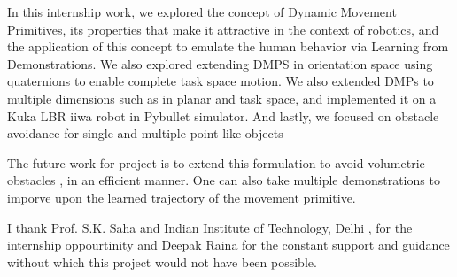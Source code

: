 In this internship work, we explored the concept of Dynamic Movement Primitives, its properties that make it
attractive in the context of robotics, and the application of this concept to emulate the human behavior via Learning
from Demonstrations. 
We also explored extending DMPS in orientation space using quaternions to enable complete task space motion. 
We also extended DMPs to multiple dimensions such as in planar and task space,
and implemented it on a Kuka LBR iiwa robot in Pybullet simulator.
And lastly, we focused on obstacle avoidance for single and multiple point like objects

The future work for project is to extend this formulation to avoid volumetric obstacles\cite{VolumetricObstacles2019} \cite{Ginesi2021_obstacle}, in an efficient manner.
One can also take multiple demonstrations to imporve upon the learned trajectory of the movement primitive. 

I thank Prof. S.K. Saha and Indian Institute of Technology, Delhi , for the internship oppourtinity and Deepak Raina for the constant support and guidance without
which this project would not have been possible. 



